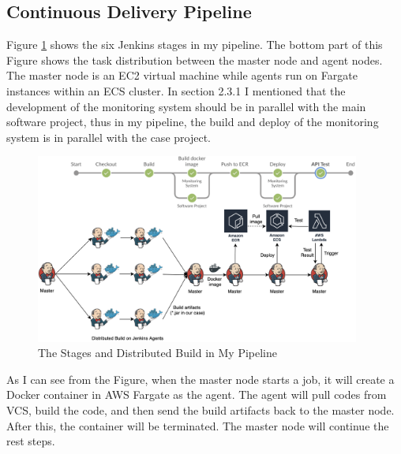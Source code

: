 \subsection{Continuous Delivery Pipeline}
\label{my-ci}
Figure \ref{fig:overview} shows the six Jenkins stages in my pipeline. The bottom part of this Figure shows the task distribution between the master node and agent nodes. The master node is an EC2 virtual machine while agents run on Fargate instances within an ECS cluster. In section 2.3.1 I mentioned that the development of the monitoring system should be in parallel with the main software project, thus in my pipeline, the build and deploy of the monitoring system is in parallel with the case project.
\begin{figure}[!h]
     \centering
     \includegraphics[width=0.95\textwidth]{pics/overview.png}
     \caption{The Stages and Distributed Build in My Pipeline}
     \label{fig:overview}
    \end{figure}
\par
As I can see from the Figure, when the master node starts a job, it will create a Docker container in AWS Fargate as the agent. The agent will pull codes from VCS, build the code, and then send the build artifacts back to the master node. After this, the container will be terminated. The master node will continue the rest steps.
